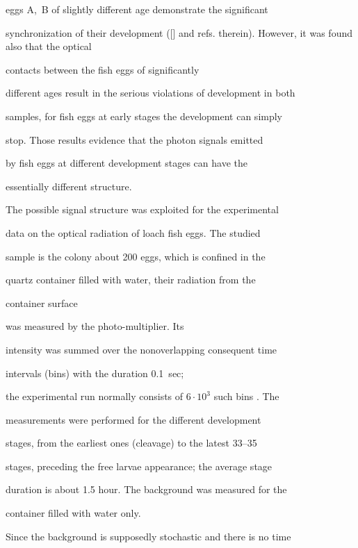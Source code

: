 eggs A,~B of slightly different age demonstrate  the  significant

synchronization of their development ([] and refs. therein). However, it was found also that the optical

 contacts  between the fish eggs of significantly

  different ages result in  the serious violations of development in both

samples, for fish eggs at early stages the development can simply

stop. Those results evidence that the photon signals emitted

by fish eggs at different development stages can have the

essentially different structure.



\smallskip




 The possible signal structure was exploited for the experimental

data on the optical radiation of loach fish eggs. The studied

sample is  the colony about 200 eggs,  which  is confined in the

quartz container filled with  water, their radiation from the

container surface

 was measured by the photo-multiplier.  Its

intensity was summed over the  nonoverlapping consequent time

intervals (bins) with the duration 0.1~sec;

the experimental run normally consists of $6 \cdot 10^3$  such bins \cite {mayb:1}. The

measurements were performed for the  different development

stages, from the earliest ones (cleavage)  to the latest 33--35

stages, preceding the free larvae appearance; the average stage

duration is about  1.5 hour. The background was  measured for the

container filled with  water only.





Since the background is supposedly stochastic and there is no time

